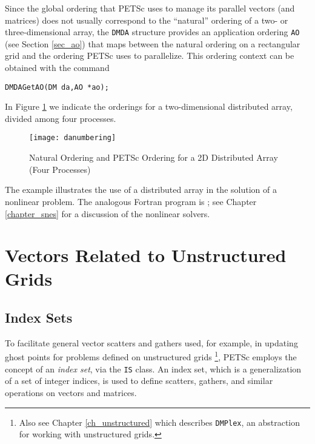 Since the global ordering that PETSc uses to manage its parallel vectors
(and matrices) does not usually correspond to the ``natural'' ordering
of a two- or three-dimensional array, the \lstinline{DMDA} structure provides
an application ordering \lstinline{AO} (see Section \ref{sec_ao}) that maps
between the natural ordering on a rectangular grid and the ordering PETSc
uses to parallelize. This ordering context can be obtained with the command
\begin{lstlisting}
DMDAGetAO(DM da,AO *ao);
\end{lstlisting}
In Figure \ref{fig_daao} we indicate the orderings for a two-dimensional distributed
array, divided among four processes.

\begin{figure}[tb]
\centerline{ \texttt{[image: danumbering]}}
\caption{Natural Ordering and PETSc Ordering for a 2D Distributed Array (Four Processes)}
\label{fig_daao}
\end{figure}

The example
\href{http://www.mcs.anl.gov/petsc/petsc-current/src/snes/examples/tutorials/ex5.c.html}{}
illustrates the use of a distributed array in the solution of
a nonlinear problem.  The analogous Fortran program is
\href{http://www.mcs.anl.gov/petsc/petsc-current/src/snes/examples/tutorials/ex5.c.html}{};
see Chapter \ref{chapter_snes} for a discussion of the nonlinear
solvers.

\section{Vectors Related to Unstructured Grids}
\label{sec_unstruct}

\subsection{Index Sets} 
\label{sec_indexset}

To facilitate general vector scatters and gathers used, for example, in updating
ghost points for problems defined on unstructured grids
\footnote{Also see Chapter \ref{ch_unstructured} which describes \lstinline{DMPlex}, an abstraction for working with unstructured grids.},
PETSc employs the concept of an {\em index set}, via the \lstinline{IS} class.  
An index set, which is a generalization of a
set of integer indices, is used to define scatters, gathers, and similar
operations on vectors and matrices.

